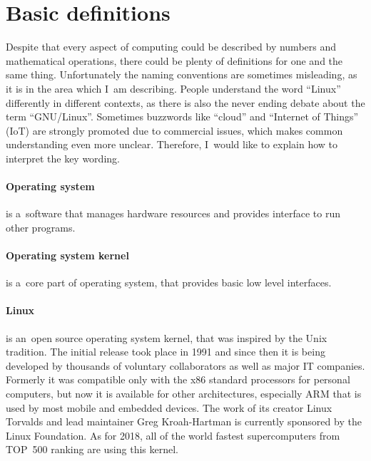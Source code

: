 \documentclass[printmode]{mgr}
\begin{document}
\section{Basic definitions}

Despite that every aspect of computing could be described by numbers and mathematical operations, there could be plenty of definitions for one and the same thing. Unfortunately the naming conventions are sometimes misleading, as it is in the area which I~am describing. People understand the word ``Linux'' differently in different contexts, as there is also the never ending debate about the term ``GNU/Linux''.\cite{web:gnu-linux} Sometimes buzzwords like ``cloud'' and ``Internet of Things'' (IoT) are strongly promoted due to commercial issues, which makes common understanding even more unclear. Therefore, I~would like to explain how to interpret the key wording.

\paragraph{Operating system} is a~software that manages hardware resources and provides interface to run other programs.\cite{web:def-os}

\paragraph{Operating system kernel} is a~core part of operating system, that provides  basic low level interfaces.\cite{web:def-kernel}

\paragraph{Linux} is an~open source operating system kernel, that was inspired by the Unix tradition. The initial release took place in 1991 and since then it is being developed by thousands of voluntary collaborators as well as major IT companies. Formerly it was compatible only with the x86 standard processors for personal computers, but now it is available for other architectures, especially ARM that is used by most mobile and embedded devices. The work of its creator Linux Torvalds and lead maintainer Greg Kroah-Hartman is currently sponsored by the Linux Foundation. As for 2018, all of the world fastest supercomputers from TOP~500 ranking are using this kernel.
\end{document}
